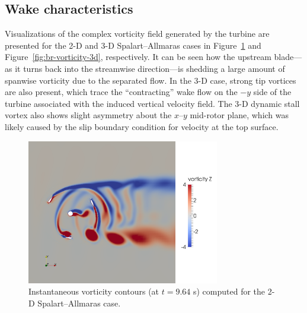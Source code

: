 \documentclass[aip,graphicx]{revtex4-1}
\begin{document}
\subsection{Wake characteristics}

Visualizations of the complex vorticity field generated by the turbine are
presented for the 2-D and 3-D Spalart--Allmaras cases in
Figure~\ref{fig:br-vorticity-2d} and Figure~\ref{fig:br-vorticity-3d},
respectively. It can be seen how the upstream blade---as it turns back into the
streamwise direction---is shedding a large amount of spanwise vorticity due to
the separated flow. In the 3-D case, strong tip vortices are also present, which
trace the ``contracting'' wake flow on the $-y$ side of the turbine associated
with the induced vertical velocity field. The 3-D dynamic stall vortex also
shows slight asymmetry about the $x$--$y$ mid-rotor plane, which was likely
caused by the slip boundary condition for velocity at the top surface.

\begin{figure}
    \centering

    \includegraphics[width=0.75\textwidth]{2D_vorticity_SA_964}

    \caption{Instantaneous vorticity contours (at $t=9.64$ s) computed for the
        2-D Spalart--Allmaras case.}

    \label{fig:br-vorticity-2d}
\end{figure}
\end{document}
